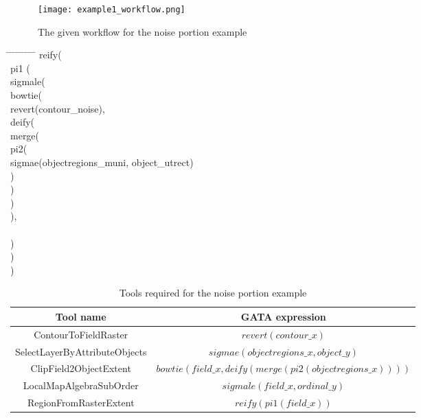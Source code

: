 \documentclass{article}
\begin{document}

\begin{sidewaysfigure}
  \centering
    \texttt{[image: example1\_workflow.png]}
    \caption{The given workflow for the noise portion example }
    \label{figure:noisePortionworkflow}
\end{sidewaysfigure}

\begin{tabbing}    
\hspace{0.5cm}     \= \hspace{0.5cm}  \= \hspace{0.5cm}  \= \hspace{0.5cm}  \=\hspace{0.5cm}  \=\hspace{0.5cm} \= \hspace{0.5cm}  \= \hspace{0.5cm} \= \hspace{0.5cm} \= \hspace{0.5cm}\kill
reify( \\
\> pi1 ( \\
\>\>sigmale(\\
\>\>\>bowtie(\\
\>\>\>\>revert(contour\_noise),\\ 
\>\>\>\>deify(\\
\>\>\>\>\>merge(\\
\>\>\>\>\>\>pi2(\\
\>\>\>\>\>\>\>sigmae(objectregions\_muni, object\_utrect)\\
\>\>\>\>\>\>)\\
\>\>\>\>\>)\\
\>\>\>\>)\\
\>\>\>),\\
\>\>\\
\>\>)\\
\>)\\
)
\end{tabbing}

\begin{table}[h]
    \centering
    \begin{tabular}{|c|c|}
        \hline
        Tool name & GATA expression  \\
        \hline
        ContourToFieldRaster & $revert (contour\_x)$\\
        \hline
        SelectLayerByAttributeObjects & $sigmae (objectregions\_x, object\_y)$\\
        \hline
        ClipField2ObjectExtent & $bowtie (field\_x, deify (merge (pi2 (objectregions\_x))))$\\
        \hline
        LocalMapAlgebraSubOrder & $sigmale (field\_x, ordinal\_y)$\\
        \hline
        RegionFromRasterExtent & $reify (pi1 (field\_x))$\\
        \hline
    \end{tabular}
    \caption{Tools required for the noise portion example}
    \label{tab:example1tools}
\end{table}
\end{document}
